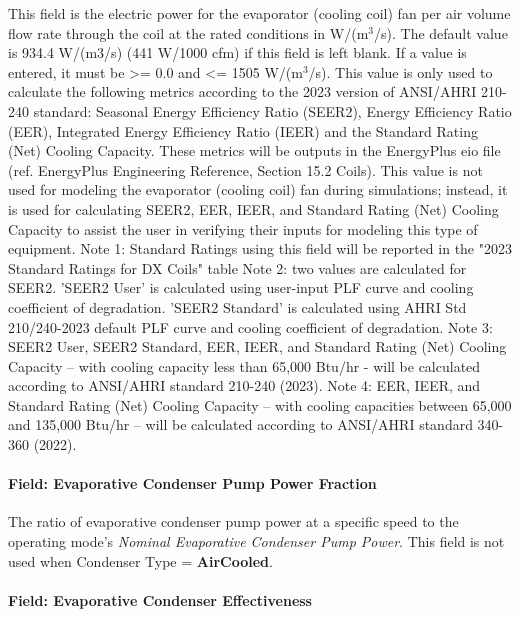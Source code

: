 This field is the electric power for the evaporator (cooling coil) fan per air volume flow rate through the coil at the rated conditions in W/(m\(^{3}\)/s). The default value is 934.4 W/(m3/s) (441 W/1000 cfm) if this field is left blank. If a value is entered, it must be \textgreater{}= 0.0 and \textless{}= 1505 W/(m\(^{3}\)/s). This value is only used to calculate the following metrics according to the 2023 version of ANSI/AHRI 210-240 standard: Seasonal Energy Efficiency Ratio (SEER2), Energy Efficiency Ratio (EER), Integrated Energy Efficiency Ratio (IEER) and the Standard Rating (Net) Cooling Capacity.  These metrics will be outputs in the EnergyPlus eio file (ref. EnergyPlus Engineering Reference, Section 15.2 Coils). This value is not used for modeling the evaporator (cooling coil) fan during simulations; instead, it is used for calculating SEER2, EER, IEER, and Standard Rating (Net) Cooling Capacity to assist the user in verifying their inputs for modeling this type of equipment.
Note 1: Standard Ratings using this field will be reported in the "2023 Standard Ratings for DX Coils" table
Note 2: two values are calculated for SEER2. 'SEER2 User' is calculated using user-input PLF curve and cooling coefficient of degradation. 'SEER2 Standard' is calculated using AHRI Std 210/240-2023 default PLF curve and cooling coefficient of degradation.
Note 3: SEER2 User, SEER2 Standard, EER, IEER, and Standard Rating (Net) Cooling Capacity -- with cooling capacity less than 65,000 Btu/hr - will be calculated according to ANSI/AHRI standard 210-240 (2023).
Note 4: EER, IEER, and Standard Rating (Net) Cooling Capacity -- with cooling capacities between 65,000 and 135,000 Btu/hr -- will be calculated according to ANSI/AHRI standard 340-360 (2022).

\paragraph{Field: Evaporative Condenser Pump Power Fraction}\label{field-evaporative-condenser-pump-power-fraction}

The ratio of evaporative condenser pump power at a specific speed to the operating mode's \textit{Nominal Evaporative Condenser Pump Power}. This field is not used when Condenser Type = \textbf{AirCooled}.

\paragraph{Field: Evaporative Condenser Effectiveness}

